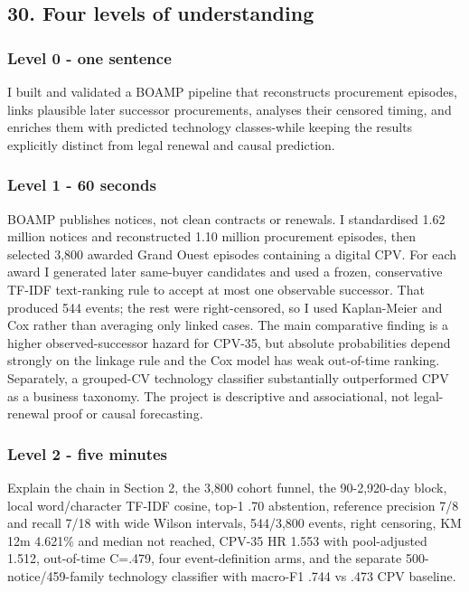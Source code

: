 \subsection{30. Four levels of
understanding}\label{30-four-levels-of-understanding}

\subsubsection{Level 0 - one sentence}\label{level-0--one-sentence}

I built and validated a BOAMP pipeline that reconstructs procurement
episodes, links plausible later successor procurements, analyses their
censored timing, and enriches them with predicted technology
classes-while keeping the results explicitly distinct from legal renewal
and causal prediction.

\subsubsection{Level 1 - 60 seconds}\label{level-1--60-seconds}

BOAMP publishes notices, not clean contracts or renewals. I standardised
1.62 million notices and reconstructed 1.10 million procurement
episodes, then selected 3,800 awarded Grand Ouest episodes containing a
digital CPV. For each award I generated later same-buyer candidates and
used a frozen, conservative TF-IDF text-ranking rule to accept at most
one observable successor. That produced 544 events; the rest were
right-censored, so I used Kaplan-Meier and Cox rather than averaging
only linked cases. The main comparative finding is a higher
observed-successor hazard for CPV-35, but absolute probabilities depend
strongly on the linkage rule and the Cox model has weak out-of-time
ranking. Separately, a grouped-CV technology classifier substantially
outperformed CPV as a business taxonomy. The project is descriptive and
associational, not legal-renewal proof or causal forecasting.

\subsubsection{Level 2 - five minutes}\label{level-2--five-minutes}

Explain the chain in Section 2, the 3,800 cohort funnel, the
90-2,920-day block, local word/character TF-IDF cosine, top-1 .70
abstention, reference precision 7/8 and recall 7/18 with wide Wilson
intervals, 544/3,800 events, right censoring, KM 12m 4.621\% and median
not reached, CPV-35 HR 1.553 with pool-adjusted 1.512, out-of-time
C=.479, four event-definition arms, and the separate
500-notice/459-family technology classifier with macro-F1 .744 vs .473
CPV baseline.

